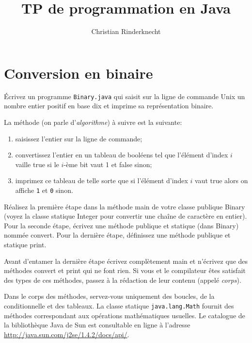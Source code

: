\documentclass[11pt,a4paper]{article}
\title{TP de programmation en Java}
\author{Christian Rinderknecht}
\begin{document}
\maketitle

\section{Conversion en binaire}

Écrivez un programme \texttt{Binary.java} qui saisit sur la ligne de
commande Unix un nombre entier positif en base dix et imprime sa
représentation binaire.

\noindent La méthode (on parle d'\emph{algorithme}) à suivre est la
suivante:

\begin{enumerate}

  \item saisissez l'entier sur la ligne de commande;

  \item convertissez l'entier en un tableau de booléens tel que
  l'élément d'index $i$ vaille \textsf{true} si le $i$-ème bit vaut
  1 et \textsf{false} sinon;

  \item imprimez ce tableau de telle sorte que si l'élément d'index
  $i$ vaut \textsf{true} alors on affiche \texttt{1} et \texttt{0}
  sinon.

\end{enumerate}

Réalisez la première étape dans la méthode \textsf{main} de votre
classe publique \textsf{Binary} (voyez la classe statique
\textsf{Integer} pour convertir une chaîne de caractère en
entier). Pour la seconde étape, écrivez une méthode publique et
statique (dans \textsf{Binary}) nommée \textsf{convert}. Pour la
dernière étape, définissez une méthode publique et statique
\textsf{print}.

Avant d'entamer la dernière étape écrivez complètement \textsf{main}
et n'écrivez que des méthodes \textsf{convert} et \textsf{print} qui
ne font rien. Si vous et le compilateur êtes satisfait des types de
ces méthodes, passez à la rédaction de leur contenu (appelé
\emph{corps}).

Dans le corps des méthodes, servez-vous uniquement des boucles, de la
conditionnelle et des tableaux. La classe statique
\texttt{java.lang.Math} fournit des méthodes correspondant aux
opérations mathématiques usuelles. Le catalogue de la bibliothèque
Java de Sun est consultable en ligne à l'adresse
\url{http://java.sun.com/j2se/1.4.2/docs/api/}.
\end{document}
